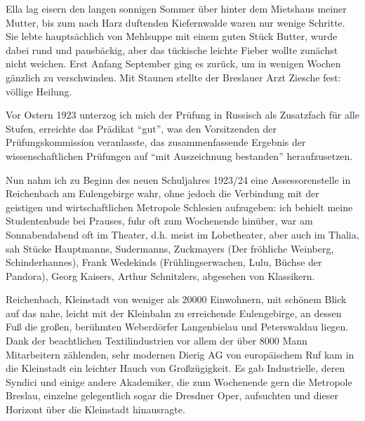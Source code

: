 Ella lag eisern den langen sonnigen Sommer über hinter dem Mietshaus meiner Mutter, bis zum nach Harz duftenden Kiefernwalde waren nur wenige Schritte. Sie lebte hauptsächlich von Mehlsuppe mit einem guten Stück Butter, wurde dabei rund und pausbäckig, aber das tückische leichte Fieber wollte zunächst nicht weichen. Erst Anfang September ging es zurück, um in wenigen Wochen gänzlich zu verschwinden. Mit Staunen stellte der Breslauer Arzt Ziesche fest: völlige Heilung.

Vor Ostern 1923 unterzog ich mich der Prüfung in Russisch als Zusatzfach für alle Stufen, erreichte das Prädikat \enquote{gut}, was den Vorsitzenden der Prüfungskommission veranlasste, das zusammenfassende Ergebnis der wissenschaftlichen Prüfungen auf \enquote{mit Auszeichnung bestanden} heraufzusetzen.

Nun nahm ich zu Beginn des neuen Schuljahres 1923/24 eine Assessorenstelle in Reichenbach am Eulengebirge wahr, ohne jedoch die Verbindung mit der geistigen und wirtschaftlichen Metropole Schlesien aufzugeben: ich behielt meine Studentenbude bei Prauses, fuhr oft zum Wochenende hinüber, war am Sonnabendabend oft im Theater, d.h. meist im Lobetheater, aber auch im Thalia, sah Stücke Hauptmanns, Sudermanns, Zuckmayers (Der fröhliche Weinberg, Schinderhannes), Frank Wedekinds (Frühlingserwachen, Lulu, Büchse der Pandora), Georg Kaisers, Arthur Schnitzlers, abgesehen von Klassikern.

Reichenbach, Kleinstadt von weniger als \num{20000} Einwohnern, mit schönem Blick auf das nahe, leicht mit der Kleinbahn zu erreichende Eulengebirge, an dessen Fuß die großen, berühmten Weberdörfer Langenbielau und Peterswaldau liegen. Dank der beachtlichen Textilindustrien vor allem der über \num{8000} Mann Mitarbeitern zählenden, sehr modernen Dierig AG von europäischem Ruf kam in die Kleinstadt ein leichter Hauch von Großzügigkeit. Es gab Industrielle, deren Syndici und einige andere Akademiker, die zum Wochenende gern die Metropole Breslau, einzelne gelegentlich sogar die Dresdner Oper, aufsuchten und dieser Horizont über die Kleinstadt hinausragte.


